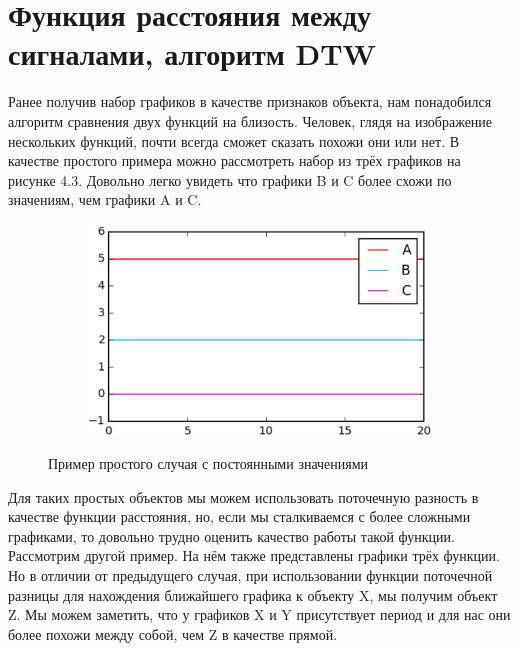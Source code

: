 \section{Функция расстояния между сигналами, алгоритм DTW}

Ранее получив набор графиков в качестве признаков объекта, нам понадобился алгоритм сравнения двух функций на близость. Человек, глядя на изображение нескольких функций, почти всегда сможет сказать похожи они или нет. В качестве простого примера можно рассмотреть набор из трёх графиков на рисунке 4.3. Довольно легко увидеть что графики B и C более схожи по значениям, чем графики A и C.

\begin{figure}[ht]
	\centering
    \begin{subfigure}[b]{1\textwidth}
    \centering
        \includegraphics[scale=0.5]{pasted-image-35.png}        
    \end{subfigure}
 
    \caption{Пример простого случая с постоянными значениями}
    \label{fig_parsetree}
\end{figure}

Для таких простых объектов мы можем использовать поточечную разность в качестве функции расстояния, но, если мы сталкиваемся с более сложными графиками, то довольно трудно оценить качество работы такой функции. Рассмотрим другой пример. На нём также представлены графики трёх функции. Но в отличии от предыдущего случая, при использовании функции поточечной разницы для нахождения ближайшего графика к объекту X, мы получим объект Z. Мы можем заметить, что у графиков X и Y присутствует период и для нас они более похожи между собой, чем Z в качестве прямой.

